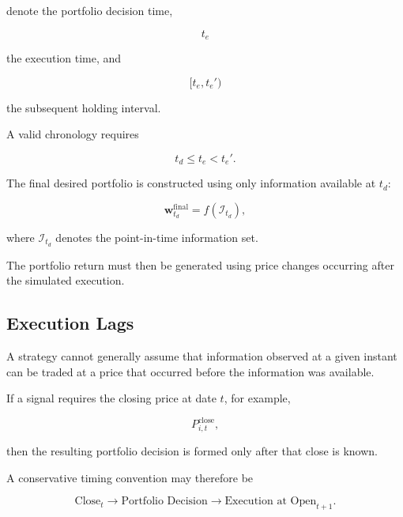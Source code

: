 \documentclass[11pt,a4paper]{article}
\begin{document}
denote the portfolio decision time,

\begin{equation}
t_e
\end{equation}

the execution time, and

\begin{equation}
[t_e,t_e')
\end{equation}

the subsequent holding interval.

A valid chronology requires

\begin{equation}
\boxed{
t_d
\leq
t_e
<
t_e'.
}
\end{equation}

The final desired portfolio is constructed using only information available at
$t_d$:

\begin{equation}
\boxed{
\mathbf{w}_{t_d}^{\mathrm{final}}
=
f
\left(
\mathcal{I}_{t_d}
\right),
}
\end{equation}

where $\mathcal{I}_{t_d}$ denotes the point-in-time information set.

The portfolio return must then be generated using price changes occurring after
the simulated execution.


\subsection{Execution Lags}

A strategy cannot generally assume that information observed at a given instant
can be traded at a price that occurred before the information was available.

If a signal requires the closing price at date $t$, for example,

\begin{equation}
P_{i,t}^{\mathrm{close}},
\end{equation}

then the resulting portfolio decision is formed only after that close is known.

A conservative timing convention may therefore be

\begin{equation}
\boxed{
\text{Close}_t
\rightarrow
\text{Portfolio Decision}
\rightarrow
\text{Execution at Open}_{t+1}.
}
\end{equation}
\end{document}
